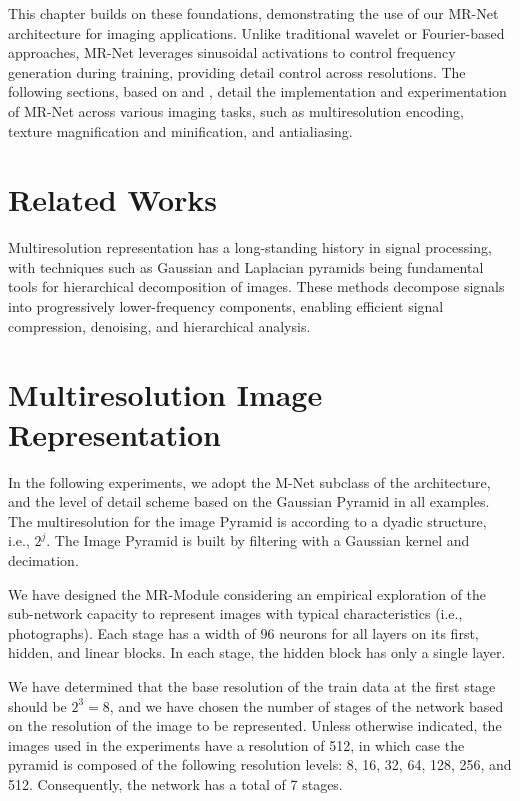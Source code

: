 This chapter builds on these foundations, demonstrating the use of our MR-Net architecture for imaging applications. Unlike traditional wavelet or Fourier-based approaches, MR-Net leverages sinusoidal activations to control frequency generation during training, providing detail control across resolutions. The following sections, based on \citet{paz2022} and \citet{paz2023mr}, detail the implementation and experimentation of MR-Net across various imaging tasks, such as multiresolution encoding, texture magnification and minification, and antialiasing.

\section{Related Works}

Multiresolution representation has a long-standing history in signal processing, with techniques such as Gaussian and Laplacian pyramids \citep{burt1987laplacian} being fundamental tools for hierarchical decomposition of images. These methods decompose signals into progressively lower-frequency components, enabling efficient signal compression, denoising, and hierarchical analysis.


\section{Multiresolution Image Representation}
\label{s:img}


In the following experiments, we adopt the M-Net subclass of the architecture, and the level of detail scheme based on the Gaussian Pyramid in all examples. The multiresolution for the image Pyramid is according to a dyadic structure, i.e., $2^j$. The Image Pyramid is built by filtering with a Gaussian kernel and decimation.

We have designed the MR-Module considering an empirical exploration of the sub-network capacity to represent images with typical characteristics (i.e., photographs). Each stage has a width of $96$ neurons for all layers on its first, hidden, and linear blocks. In each stage, the hidden block has only a single layer.

We have determined that the base resolution of the train data at the first stage should be $2^3 = 8$, and we have chosen the number of stages of the network based on the resolution of the image to be represented. Unless otherwise indicated, the images used in the experiments have a resolution of 512, in which case the pyramid is composed of the following resolution levels: 8, 16, 32, 64, 128, 256, and 512. Consequently, the network has a total of 7 stages.

